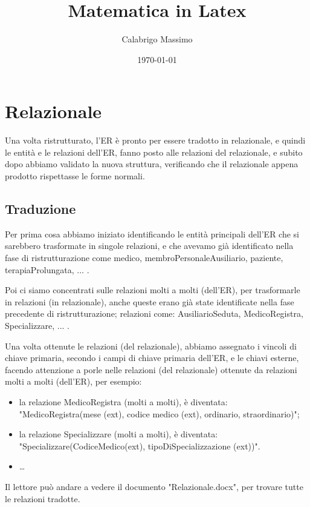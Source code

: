 \documentclass[11pt]{article}
\begin{document}
\title{Matematica in Latex}
\author{Calabrigo Massimo}
\date{\today}
\maketitle

\tableofcontents

\section{Relazionale}
Una volta ristrutturato, l'ER è pronto per essere tradotto in relazionale, e quindi le entità e le relazioni dell'ER, fanno posto alle relazioni del relazionale, e subito dopo abbiamo 
validato la nuova struttura, verificando che il relazionale appena prodotto rispettasse le forme normali.

\subsection{Traduzione}

Per prima cosa abbiamo iniziato identificando le entità principali dell'ER che si sarebbero trasformate in singole relazioni, e che avevamo già identificato nella fase di ristrutturazione come medico, membroPersonaleAusiliario, paziente, terapiaProlungata, ... .

Poi ci siamo concentrati sulle relazioni molti a molti (dell'ER), per trasformarle in relazioni (in relazionale), anche queste erano già state identificate nella fase precedente di ristrutturazione; relazioni come: AusiliarioSeduta, MedicoRegistra, Specializzare, ... .

Una volta ottenute le relazioni (del relazionale), abbiamo assegnato i vincoli di chiave primaria, secondo i campi di chiave primaria dell'ER, e le chiavi esterne, facendo attenzione a porle nelle relazioni (del relazionale) ottenute da relazioni molti a molti (dell'ER), per esempio:
\begin{itemize}
    \item la relazione MedicoRegistra (molti a molti), è diventata: "MedicoRegistra(mese (ext), codice medico (ext), ordinario, straordinario)";
    \item la relazione Specializzare (molti a molti), è diventata: "Specializzare(CodiceMedico(ext), tipoDiSpecializzazione (ext))".
    \item \dots
\end{itemize}

Il lettore può andare a vedere il documento "Relazionale.docx", per trovare tutte le relazioni tradotte.
\end{document}
